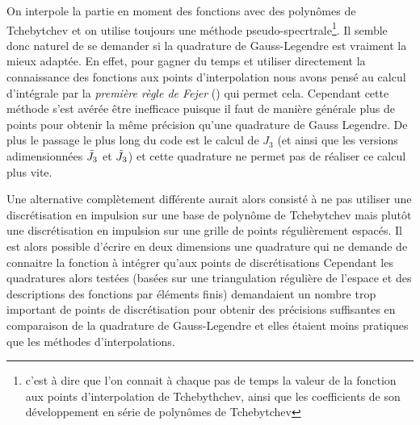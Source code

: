\documentclass[10.5pt]{article}
\begin{document}
\begin{multicols}{2}
On interpole la partie en moment des fonctions avec des polynômes de Tchebytchev et on utilise toujours une méthode pseudo-specrtrale\footnote{c'est à dire que l'on connait à chaque pas de temps la valeur de la fonction aux points d'interpolation de Tchebythchev, ainsi que les coefficients de son développement en série de polynômes de Tchebytchev}. Il semble donc naturel de se demander si la quadrature de Gauss-Legendre est vraiment la mieux adaptée. En effet, pour gagner du temps et utiliser directement la connaissance des fonctions aux points d'interpolation nous avons pensé au calcul d'intégrale par la \emph{première règle de Fejer} \cite{waldvogel2006fast} () qui permet cela. %
 Cependant cette méthode s'est avérée être inefficace puisque il faut de manière générale plus de points pour obtenir la même précision qu'une quadrature de Gauss Legendre. De plus le passage le plus long du code est le calcul de $J_3$ (et ainsi que les versions adimensionnées $\bar{J}_3$ et $\tilde{J}_3$) et cette quadrature ne permet pas de réaliser ce calcul plus vite.%

Une alternative complètement différente aurait alors consisté %
à ne pas utiliser une discrétisation en impulsion sur une base de polynôme de Tchebytchev mais plutôt une discrétisation en impulsion sur une grille de points régulièrement espacés. Il est alors possible d'écrire en deux dimensions une quadrature qui ne demande de connaitre la fonction à intégrer qu'aux points de discrétisations %
Cependant les quadratures alors testées (basées sur une triangulation régulière de l'espace et des descriptions des fonctions par éléments finis) demandaient un nombre trop important de points de discrétisation pour obtenir des précisions suffisantes en comparaison de la quadrature de Gauss-Legendre et elles étaient moins pratiques que les méthodes d'interpolations. 




\end{multicols}
\end{document}
